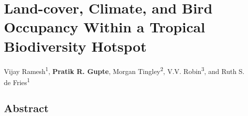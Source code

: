 \chapter{Land-cover, Climate, and Bird Occupancy Within a Tropical Biodiversity Hotspot}\label{ch:hillybirds}

\noindent Vijay Ramesh\textsuperscript{1}, \textbf{Pratik R. Gupte}, Morgan Tingley\textsuperscript{2}, V.V. Robin\textsuperscript{3}, and Ruth S. de Fries\textsuperscript{1}


\section*{Abstract}

